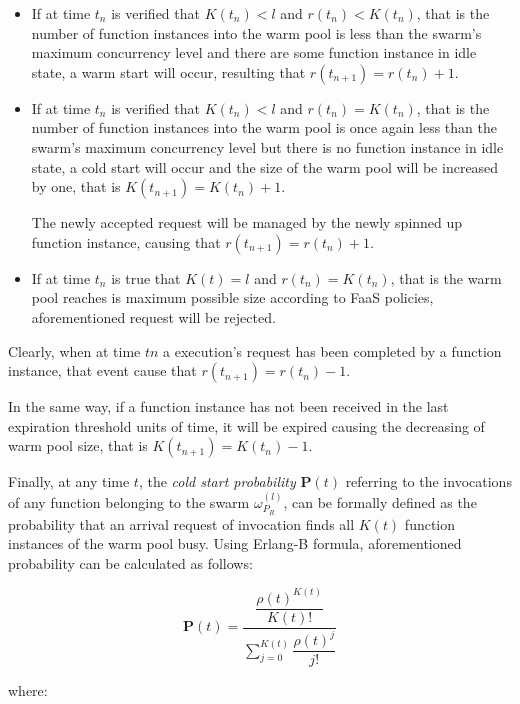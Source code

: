 \documentclass[12pt,a4paper]{report}
\theoremstyle{definition}
\begin{document}
\begin{itemize}
	\item If at time $t_n$ is verified that $K(t_n) < l$ and $r(t_n) < K(t_n)$, that is the number of function instances into the warm pool is less than the swarm's maximum concurrency level and there are some function instance in idle state, a warm start will occur, resulting that $r(t_{n+1}) = r(t_n) + 1$.
	
	
	\item If at time $t_n$ is verified that $K(t_n) < l$ and $r(t_n) = K(t_n)$, that is the number of function instances into the warm pool is once again less than the swarm's maximum concurrency level but there is no function instance in idle state, a cold start will occur and the size of the warm pool will be increased by one, that is $K(t_{n+1}) = K(t_n) + 1$.
	
	The newly accepted request will be managed by the newly spinned up function instance, causing that $r(t_{n+1}) = r(t_n) + 1$.
	
	\item If at time $t_n$ is true that $K(t) = l$ and $r(t_n) = K(t_n)$, that is the warm pool reaches is maximum possible size according to FaaS policies, aforementioned request will be rejected.
\end{itemize}

Clearly, when at time $tn$ a execution's request has been completed by a function instance, that event cause that $r(t_{n+1}) = r(t_n) - 1$. 

In the same way, if a function instance has not been received in the last expiration threshold units of time, it will be expired causing the decreasing of warm pool size, that is $K(t_{n+1}) = K(t_n) -1$.

Finally, at any time $t$, the \textit{cold start probability} $\textbf{P}(t)$ referring to the invocations of any function belonging to the swarm $\omega_{P_R}^{(l)}$, can be formally defined as the probability that an arrival request of invocation finds all $K(t)$ function instances of the warm pool busy. Using Erlang-B formula, aforementioned probability can be calculated as follows:

\begin{equation}
	\displaystyle \textbf{P}(t) = \dfrac{\dfrac{\rho(t)^{K(t)}}{K(t)!}}{\displaystyle\sum_{j=0}^{K(t)} \dfrac{\rho(t)^j}{j!}}
\end{equation}

where:
\end{document}
